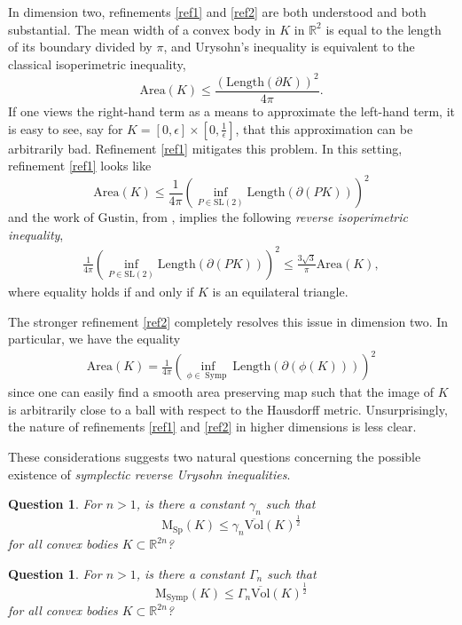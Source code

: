\documentclass[12pt]{amsart}
\newtheorem{question}[theorem]{Question}
\theoremstyle{definition}
\newcommand\Symp{\operatorname{Symp}}
\newcommand{\RR}{{\mathbb R}}
\newcommand{\lmw}{{\mathrm {M}}_{\mathrm{Sp}}}
\newcommand{\nlmw}{\mathrm{M}_{{\Symp}}}
\newcommand{\sv}{{\overline{{\mathrm{Vol}}}}}
\begin{document}
In dimension two, refinements \ref{ref1} and \ref{ref2} are both understood and both substantial. The mean width of a convex body in $K$ in $\RR^{2}$ is equal to the length of its boundary divided by $\pi$, and Urysohn's inequality is equivalent to the classical isoperimetric inequality,
$$\mathrm{Area}(K) \leq \frac{(\mathrm{Length}(\partial K))^2}{4\pi}.$$
If one views the right-hand term as a means to approximate the left-hand term, it is easy to see, say for $K= [0,\epsilon] \times [0, \frac{1}{\epsilon}]$, that this approximation can be arbitrarily bad. Refinement \eqref{ref1} mitigates this problem. In this setting,  refinement \eqref{ref1} looks like
$$\mathrm{Area}(K) \leq \frac{1}{4\pi}\left(\inf_{P \in \mathrm{SL}(2)}\mathrm{Length}(\partial (PK))\right)^2$$  and the work of Gustin, from \cite{gu},  implies the following {\em reverse isoperimetric inequality},
\begin{align*}
 \frac{1}{4\pi}\left(\inf_{P \in \mathrm{SL}(2)}\mathrm{Length}(\partial (PK))\right)^2 \leq \frac{3 \sqrt{3}}{\pi}\mathrm{Area}(K),   
\end{align*} 
where equality holds if and only if $K$ is an equilateral triangle. 

The stronger refinement \eqref{ref2} completely resolves this issue in dimension two. In particular, we have the equality 
\begin{align*} 
    \mathrm{Area}(K) =\frac{1}{4\pi}\left(\inf_{\phi \in \Symp} \mathrm{Length}(\partial (\phi(K)))\right)^2
\end{align*}
 since one can easily find a smooth area preserving map such that the image of $K$ is arbitrarily close to a ball with respect to the Hausdorff metric. Unsurprisingly, the nature of refinements \eqref{ref1} and \eqref{ref2} in higher dimensions is less clear. 
 
 
These considerations suggests two natural questions concerning the possible existence of {\em symplectic reverse Urysohn inequalities}. 

\begin{question}\label{l} For $n>1$, is there a constant $\gamma_n$ such that 
$$\lmw (K)  \leq \gamma_n \sv(K)^{\frac{1}{2}}$$ for all convex bodies $K \subset \RR^{2n}$?
\end{question}

\begin{question}\label{c}  For $n>1$, is there a constant $\Gamma_n$ such that 
$$ \nlmw(K) \leq \Gamma_n \sv(K)^{\frac{1}{2}}$$ for all convex bodies $K \subset \RR^{2n}$?
\end{question}
\end{document}
